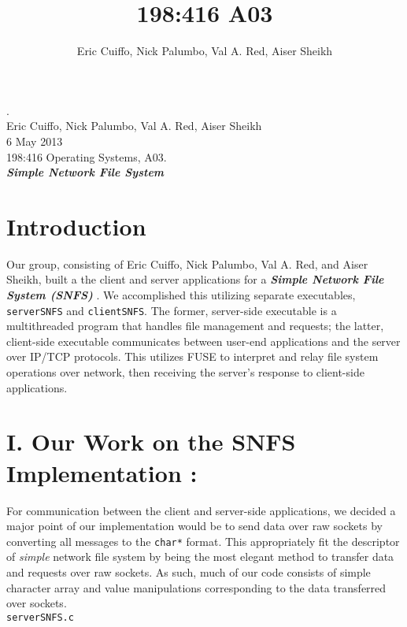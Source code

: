 \documentclass[10pt]{article}
\begin{document}
\title{198:416 A03}
\author{Eric Cuiffo, Nick Palumbo, Val A. Red, Aiser Sheikh}

\fancyhead{}
.\\
Eric Cuiffo, Nick Palumbo, Val A. Red, Aiser Sheikh\\
6 May 2013 \\
198:416 Operating Systems, A03. \\
\textbf{\textit{Simple Network File System}}

\section{Introduction}

Our group, consisting of Eric Cuiffo, Nick Palumbo, Val A. Red, and Aiser Sheikh, built a 
the client and server applications for a \textbf{\textit{Simple Network File System (SNFS) }}. We 
accomplished this utilizing separate executables, \texttt{serverSNFS} and \texttt{clientSNFS}. 
The former, server-side executable is a multithreaded program that handles file 
management and requests; the latter, client-side executable communicates between 
user-end applications and the server over IP/TCP protocols. This utilizes FUSE to 
interpret and relay file system operations over network, then receiving the 
server's response to client-side applications.  \\


\section{I. Our Work on the SNFS Implementation :}

For communication between the client and server-side applications, we decided a major 
point of our implementation would be to send data over raw sockets by converting all 
messages to the \texttt{char*} format. This appropriately fit the descriptor of 
\textit{simple} network file system  by being the most elegant method to 
transfer data and requests over raw sockets.  As such, much of our code consists of 
simple character array and value manipulations corresponding to the data transferred 
over sockets. \\

\texttt{serverSNFS.c} \\
\end{document}
